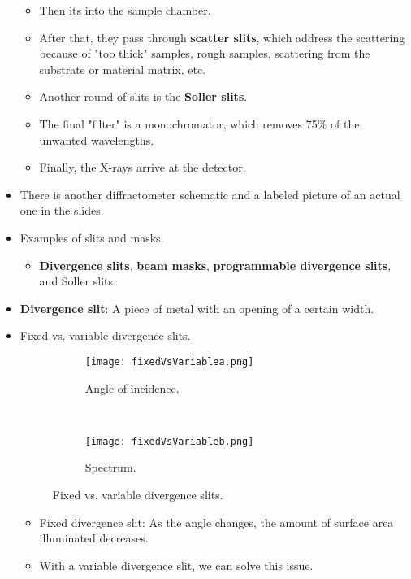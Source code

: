 \documentclass[../notes.tex]{subfiles}
\begin{document}
\begin{itemize}
\begin{itemize}
        \item Then its into the sample chamber.
        \item After that, they pass through \textbf{scatter slits}, which address the scattering because of "too thick" samples, rough samples, scattering from the substrate or material matrix, etc.
        \item Another round of slits is the \textbf{Soller slits}.
        \item The final "filter" is a monochromator, which removes 75\% of the unwanted wavelengths.
        \item Finally, the X-rays arrive at the detector.
    \end{itemize}
    \item There is another diffractometer schematic and a labeled picture of an actual one in the slides.
    \item Examples of slits and masks.
    \begin{itemize}
        \item \textbf{Divergence slits}, \textbf{beam masks}, \textbf{programmable divergence slits}, and Soller slits.
    \end{itemize}
    \item \textbf{Divergence slit}: A piece of metal with an opening of a certain width.
    \item Fixed vs. variable divergence slits.
    \begin{figure}[h!]
        \centering
        \begin{subfigure}[b]{\linewidth}
            \centering
            \texttt{[image: fixedVsVariablea.png]}
            \caption{Angle of incidence.}
            \label{fig:fixedVsVariablea}
        \end{subfigure}\\[2em]
        \begin{subfigure}[b]{\linewidth}
            \centering
            \texttt{[image: fixedVsVariableb.png]}
            \caption{Spectrum.}
            \label{fig:fixedVsVariableb}
        \end{subfigure}
        \caption{Fixed vs. variable divergence slits.}
        \label{fig:fixedVsVariable}
    \end{figure}
    \begin{itemize}
        \item Fixed divergence slit: As the angle changes, the amount of surface area illuminated decreases.
        \item With a variable divergence slit, we can solve this issue.

\end{itemize}
\end{itemize}
\end{document}
